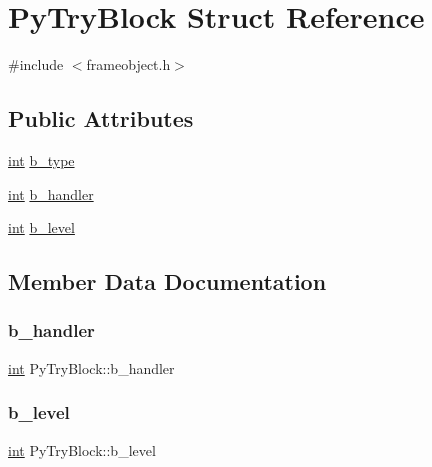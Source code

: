 \hypertarget{struct_py_try_block}{}\section{Py\+Try\+Block Struct Reference}
\label{struct_py_try_block}


{\ttfamily \#include $<$frameobject.\+h$>$}

\subsection*{Public Attributes}
\begin{DoxyCompactItemize}
\item 
\mbox{\hyperlink{warnings_8h_a74f207b5aa4ba51c3a2ad59b219a423b}{int}} \mbox{\hyperlink{struct_py_try_block_aa418848c5fe8697d30b6e77bcb6f27e9}{b\+\_\+type}}
\item 
\mbox{\hyperlink{warnings_8h_a74f207b5aa4ba51c3a2ad59b219a423b}{int}} \mbox{\hyperlink{struct_py_try_block_a6c044684e86321ee19c9e283415d98d7}{b\+\_\+handler}}
\item 
\mbox{\hyperlink{warnings_8h_a74f207b5aa4ba51c3a2ad59b219a423b}{int}} \mbox{\hyperlink{struct_py_try_block_af72df02b69c40e42ff37aac22aab2ff3}{b\+\_\+level}}
\end{DoxyCompactItemize}


\subsection{Member Data Documentation}
\mbox{\label{struct_py_try_block_a6c044684e86321ee19c9e283415d98d7}} 
\subsubsection{\texorpdfstring{b\_handler}{b\_handler}}
{\footnotesize\ttfamily \mbox{\hyperlink{warnings_8h_a74f207b5aa4ba51c3a2ad59b219a423b}{int}} Py\+Try\+Block\+::b\+\_\+handler}

\mbox{\label{struct_py_try_block_af72df02b69c40e42ff37aac22aab2ff3}} 
\subsubsection{\texorpdfstring{b\_level}{b\_level}}
{\footnotesize\ttfamily \mbox{\hyperlink{warnings_8h_a74f207b5aa4ba51c3a2ad59b219a423b}{int}} Py\+Try\+Block\+::b\+\_\+level}

